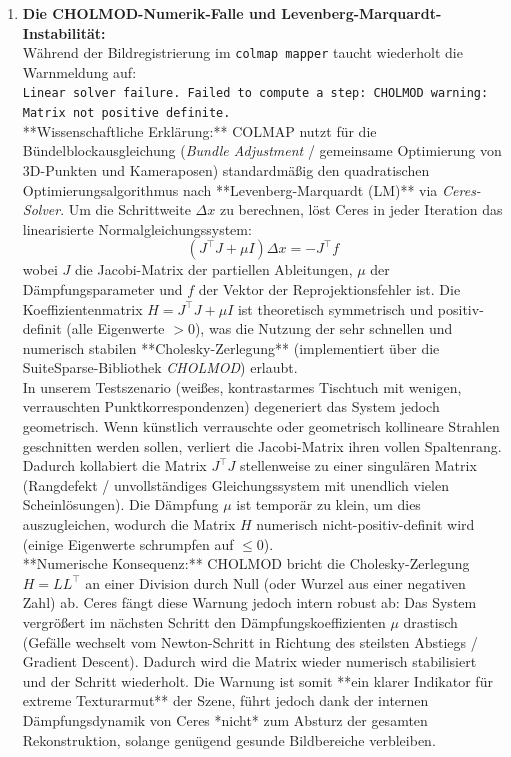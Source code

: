 \documentclass[12pt,a4paper]{article}
\begin{document}
\begin{enumerate}[noitemsep]
    \item \textbf{Die CHOLMOD-Numerik-Falle und Levenberg-Marquardt-Instabilität:} \\
          Während der Bildregistrierung im \texttt{colmap mapper} taucht wiederholt die Warnmeldung auf: \\
          \texttt{Linear solver failure. Failed to compute a step: CHOLMOD warning: Matrix not positive definite.} \\
          **Wissenschaftliche Erklärung:** COLMAP nutzt für die Bündelblockausgleichung (\textit{Bundle Adjustment} / gemeinsame Optimierung von 3D-Punkten und Kameraposen) standardmäßig den quadratischen Optimierungsalgorithmus nach **Levenberg-Marquardt (LM)** via \textit{Ceres-Solver}. Um die Schrittweite $\Delta x$ zu berechnen, löst Ceres in jeder Iteration das linearisierte Normalgleichungssystem:
          \[
          (J^{\top} J + \mu I) \Delta x = -J^{\top} f
          \]
          wobei $J$ die Jacobi-Matrix der partiellen Ableitungen, $\mu$ der Dämpfungsparameter und $f$ der Vektor der Reprojektionsfehler ist. Die Koeffizientenmatrix $H = J^{\top} J + \mu I$ ist theoretisch symmetrisch und positiv-definit (alle Eigenwerte $> 0$), was die Nutzung der sehr schnellen und numerisch stabilen **Cholesky-Zerlegung** (implementiert über die SuiteSparse-Bibliothek \textit{CHOLMOD}) erlaubt. \\
          In unserem Testszenario (weißes, kontrastarmes Tischtuch mit wenigen, verrauschten Punktkorrespondenzen) degeneriert das System jedoch geometrisch. Wenn künstlich verrauschte oder geometrisch kollineare Strahlen geschnitten werden sollen, verliert die Jacobi-Matrix ihren vollen Spaltenrang. Dadurch kollabiert die Matrix $J^{\top} J$ stellenweise zu einer singulären Matrix (Rangdefekt / unvollständiges Gleichungssystem mit unendlich vielen Scheinlösungen). Die Dämpfung $\mu$ ist temporär zu klein, um dies auszugleichen, wodurch die Matrix $H$ numerisch nicht-positiv-definit wird (einige Eigenwerte schrumpfen auf $\le 0$). \\
          **Numerische Konsequenz:** CHOLMOD bricht die Cholesky-Zerlegung $H = L L^{\top}$ an einer Division durch Null (oder Wurzel aus einer negativen Zahl) ab. Ceres fängt diese Warnung jedoch intern robust ab: Das System vergrößert im nächsten Schritt den Dämpfungskoeffizienten $\mu$ drastisch (Gefälle wechselt vom Newton-Schritt in Richtung des steilsten Abstiegs / Gradient Descent). Dadurch wird die Matrix wieder numerisch stabilisiert und der Schritt wiederholt. Die Warnung ist somit **ein klarer Indikator für extreme Texturarmut** der Szene, führt jedoch dank der internen Dämpfungsdynamik von Ceres *nicht* zum Absturz der gesamten Rekonstruktion, solange genügend gesunde Bildbereiche verbleiben.
\end{enumerate}
\end{document}
